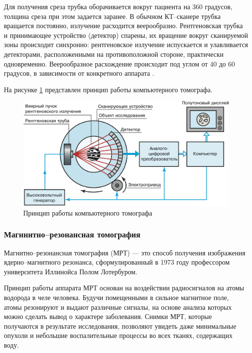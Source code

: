 Для получения среза трубка оборачивается вокруг пациента на 360 градусов, толщина среза при этом задается заранее. В обычном КТ--сканере трубка вращается постоянно, излучение расходится веерообразно. Рентгеновская трубка и принимающее устройство (детектор) спарены, их вращение вокруг сканируемой зоны происходит синхронно: рентгеновское излучение испускается и улавливается детекторами, расположенными на противоположной стороне, практически одновременно. Веерообразное расхождение происходит под углом от 40 до 60 градусов, в зависимости от конкретного аппарата \cite{ct}.

На рисунке \ref{fig:ct} представлен принцип работы компьютерного томографа.

\begin{figure}[H]
	\centering
	\includegraphics[width=\textwidth]{img/ct.jpeg}
	\caption{Принцип работы компьютерного томографа}
	\label{fig:ct}
\end{figure}

\subsubsection{Магннитно--резонансная томография}

Магнитно--резонансная томография (МРТ) --- это способ получения изображения ядерно--магнитного резонанса, сформулированный в 1973 году профессором университета Иллинойса Полом Лотербуром.

Принцип работы аппарата МРТ основан на воздействии радиосигналов на атомы водорода в челе человека. Будучи помещенными в сильное магнитное поле, атомы резонируют и выдают различные сигналы, на основе анализа которых можно сделать вывод о характере заболевания. Снимки МРТ, которые получаются в результате исследования, позволяют увидеть даже минимальные опухоли и небольшие воспалительные процессы во всех тканях, содержащих воду.

